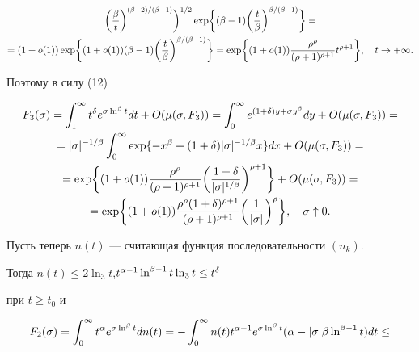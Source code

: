 \begin{pf}
\begin{multline*}
\biggl(\frac{\be}{t}\biggr)^{(\be-2)/(\be-1)}\biggr)^{1/2}


\exp\biggl\{(\be-1)\biggl(\frac{t}{\be}\biggr)^{\be/(\be-1)}\biggr\}=\\


=(1+o(1))\exp\biggl\{(1+o(1))(\be-1)


\biggl(\frac{t}{\be}\biggr)^{\be/(\be-1)}\biggr\}=


\exp\biggl\{(1+o(1))\frac{\r^\r}{(\r+1)^{\r+1}}t^{\r+1}\biggr\},\quad


t\to+\i.                   


\end{multline*}


Поэтому в силу (12)


\begin{multline}


F_3(\s)=\int_1^{\i} t^{\d}e^{\s\ln^{\be}t}dt+O(\mu(\s,F_3))=


\int_0^\i e^{(1+\d)y+\s y^{\be}}dy+O(\mu(\s,F_3))=\\


=|\s|^{-1/\be}\int_0^{\i} 


\exp\{-x^\be+(1+\d)|\s|^{-1/\be}x\}dx+O(\mu(\s,F_3))=\\ 


=\exp\biggl\{(1+o(1))\frac{\r^\r}{(\r+1)^{\r+1}}


\biggl(\frac{1+\d}{|\s|^{1/\be}}\biggr)^{\r+1}\biggr\}+O(\mu(\s,F_3))=\\


=\exp\biggl\{(1+o(1))\frac{\r^\r(1+\d)^{\r+1}}{(\r+1)^{\r+1}}


\biggl(\frac1{|\s|}\biggr)^{\r}\biggr\},\quad


\s\uparrow 0.


\end{multline}


Пусть теперь $n(t)$ --- считающая функция последовательности $(n_k)$.


Тогда $n(t)\le 2\ln_3t$,\linebreak $t^{\alpha-1} \ln^{\beta-1}t\ln_3t\le t^{\delta}$


при $t\ge t_0$ и 


\begin{multline*}


F_2(\s)=\int_0^\i t^\a e^{\s\ln^\be t}dn(t)=-


\int_0^\i n(t)t^{\a-1} e^{\s\ln^\be


t}(\a-|\s|\be\ln^{\be-1}t)dt\le\\ 



\end{multline*}
\end{pf}
